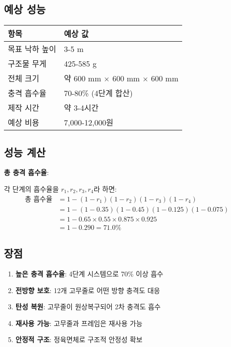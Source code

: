\documentclass[a4paper,12pt]{article}
\begin{document}
\begin{CJK}{UTF8}{mj}
\section{예상 성능}

\begin{center}
\begin{tabular}{ll}
\toprule
\textbf{항목} & \textbf{예상 값} \\
\midrule
목표 낙하 높이 & 3-5 m \\
구조물 무게 & 425-585 g \\
전체 크기 & 약 600 mm $\times$ 600 mm $\times$ 600 mm \\
충격 흡수율 & 70-80\% (4단계 합산) \\
제작 시간 & 약 3-4시간 \\
예상 비용 & 7,000-12,000원 \\
\bottomrule
\end{tabular}
\end{center}

\subsection{성능 계산}

\textbf{총 충격 흡수율}:

각 단계의 흡수율을 $r_1, r_2, r_3, r_4$라 하면:
\begin{align}
\text{총 흡수율} &= 1 - (1-r_1)(1-r_2)(1-r_3)(1-r_4) \\
&= 1 - (1-0.35)(1-0.45)(1-0.125)(1-0.075) \\
&= 1 - 0.65 \times 0.55 \times 0.875 \times 0.925 \\
&= 1 - 0.290 = 71.0\%
\end{align}

\subsection{장점}

\begin{enumerate}
    \item \textbf{높은 충격 흡수율}: 4단계 시스템으로 70\% 이상 흡수
    \item \textbf{전방향 보호}: 12개 고무줄로 어떤 방향 충격도 대응
    \item \textbf{탄성 복원}: 고무줄이 원상복구되어 2차 충격도 흡수
    \item \textbf{재사용 가능}: 고무줄과 프레임은 재사용 가능
    \item \textbf{안정적 구조}: 정육면체로 구조적 안정성 확보
\end{enumerate}


\end{CJK}
\end{document}
